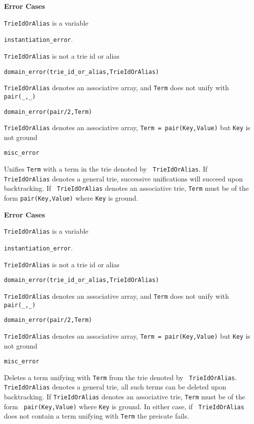 \begin{description}
{\bf Error Cases}
\bi
\item 	{\tt TrieIdOrAlias} is a variable
\bi
\item 	{\tt instantiation\_error}.
\ei
\item 	{\tt TrieIdOrAlias} is not a trie id or alias
\bi
\item 	{\tt domain\_error(trie\_id\_or\_alias,TrieIdOrAlias)}
\ei
\item 	{\tt TrieIdOrAlias} denotes an associative array, and {\tt Term} 
  does not unify with {\tt pair(\_,\_)} 
\bi
\item 	{\tt domain\_error(pair/2,Term)}
\ei
\item 	{\tt TrieIdOrAlias} denotes an associative array, 
  {\tt Term = pair(Key,Value)} but {\tt Key} is not ground 
\bi
\item 	{\tt misc\_error}
\ei
\ei
%

%
Unifies {\tt Term} with a term in the trie denoted by {\tt
  TrieIdOrAlias}.  If {\tt TrieIdOrAlias} denotes a general trie,
successive unifications will succeed upon backtracking.  If {\tt
  TrieIdOrAlias} denotes an associative trie, {\tt Term} must be of
the form {\tt pair(Key,Value)} where {\tt Key} is ground.

{\bf Error Cases}
\bi
\item 	{\tt TrieIdOrAlias} is a variable
\bi
\item 	{\tt instantiation\_error}.
\ei
\item 	{\tt TrieIdOrAlias} is not a trie id or alias
\bi
\item 	{\tt domain\_error(trie\_id\_or\_alias,TrieIdOrAlias)}
\ei
\item 	{\tt TrieIdOrAlias} denotes an associative array, and {\tt Term} 
  does not unify with {\tt pair(\_,\_)} 
\bi
\item 	{\tt domain\_error(pair/2,Term)}
\ei
\item {\tt TrieIdOrAlias} denotes an associative array, 
  {\tt Term = pair(Key,Value)} but {\tt Key} is not ground 
\bi
\item 	{\tt misc\_error}
\ei
\ei

%
Deletes a term unifying with {\tt Term} from the trie denoted by {\tt
  TrieIdOrAlias}.  {\tt TrieIdOrAlias} denotes a general trie, all
such terms can be deleted upon backtracking.  If {\tt TrieIdOrAlias}
denotes an associative trie, {\tt Term} must be of the form {\tt
  pair(Key,Value)} where {\tt Key} is ground.  In either case, if {\tt
  TrieIdOrAlias} does not contain a term unifying with {\tt Term} the
preicate fails.


\end{description}
